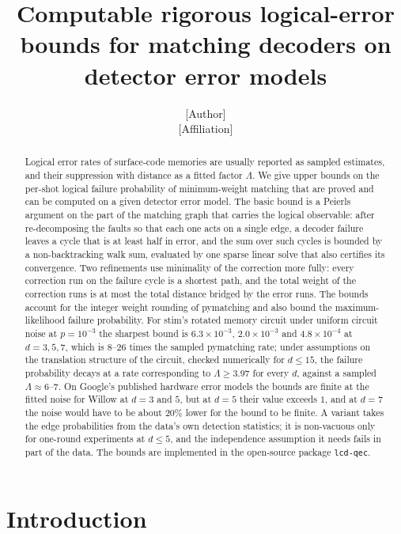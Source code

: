 \documentclass[11pt]{article}
\title{Computable rigorous logical-error bounds for matching decoders on detector error models}
\author{[Author]\\ \small [Affiliation]}
\date{}
\theoremstyle{plain}
\theoremstyle{definition}
\theoremstyle{remark}
\newcommand{\tsc}[1]{\texttt{#1}}
\renewcommand{\_}{\oldunderscore\allowbreak}
\begin{document}
\maketitle

\begin{abstract}
\noindent
Logical error rates of surface-code memories are usually reported as sampled estimates, and their suppression with distance as a fitted factor $\Lambda$. We give upper bounds on the per-shot logical failure probability of minimum-weight matching that are proved and can be computed on a given detector error model. The basic bound is a Peierls argument on the part of the matching graph that carries the logical observable: after re-decomposing the faults so that each one acts on a single edge, a decoder failure leaves a cycle that is at least half in error, and the sum over such cycles is bounded by a non-backtracking walk sum, evaluated by one sparse linear solve that also certifies its convergence. Two refinements use minimality of the correction more fully: every correction run on the failure cycle is a shortest path, and the total weight of the correction runs is at most the total distance bridged by the error runs. The bounds account for the integer weight rounding of pymatching and also bound the maximum-likelihood failure probability. For stim's rotated memory circuit under uniform circuit noise at $p=10^{-3}$ the sharpest bound is $6.3\times10^{-3}$, $2.0\times10^{-3}$ and $4.8\times10^{-4}$ at $d=3,5,7$, which is $8$--$26$ times the sampled pymatching rate; under assumptions on the translation structure of the circuit, checked numerically for $d\le15$, the failure probability decays at a rate corresponding to $\Lambda\ge3.97$ for every $d$, against a sampled $\Lambda\approx6$--$7$. On Google's published hardware error models the bounds are finite at the fitted noise for Willow at $d=3$ and $5$, but at $d=5$ their value exceeds $1$, and at $d=7$ the noise would have to be about $20\%$ lower for the bound to be finite. A variant takes the edge probabilities from the data's own detection statistics; it is non-vacuous only for one-round experiments at $d\le5$, and the independence assumption it needs fails in part of the data. The bounds are implemented in the open-source package \tsc{lcd-qec}.
\end{abstract}

\section{Introduction}\label{sec:intro}
\end{document}
